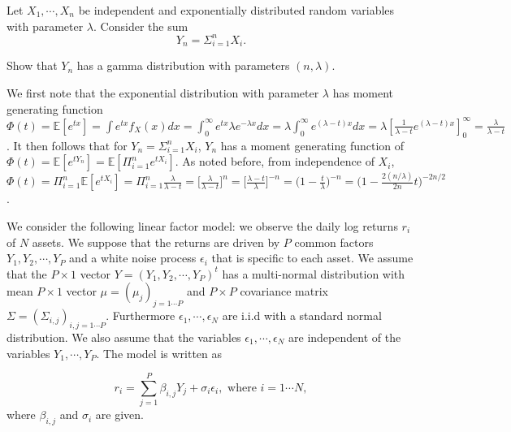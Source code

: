 \documentclass[12pt,twoside, letter]{exam}
\theoremstyle{definition}
\newcommand{\ee}{\mathbb{E}}
\begin{document}
Let $X_1,\cdots,X_n$ be independent and exponentially distributed random variables with parameter $\lambda$. Consider the sum
\[Y_n=\Sigma_{i=1}^n X_i.\]

Show that $Y_n$ has a gamma distribution with parameters $(n,\lambda)$.

\begin{solution}
  We first note that the exponential distribution with parameter $\lambda$ has moment generating function $\Phi(t) = \ee[e^{tx}] = \int e^{tx}f_X(x)dx =
  \int_{0}^{\infty} e^{tx}\lambda e^{-\lambda x}dx = \lambda \int_{0}^{\infty} e^{(\lambda - t)x}dx = \lambda [\frac{1}{\lambda - t} e^{(\lambda - t)x}]^{\infty}_{0} = \frac{\lambda}{\lambda - t}$.
  It then follows that for $Y_{n} = \Sigma_{i=1}^n X_{i}$, $Y_{n}$ has a moment generating function of $\Phi(t) = \ee[e^{tY_{n}}] = \ee[\Pi^{n}_{i=1} e^{tX_{i}}]$. As noted before, from independence
  of $X_{i}$, $\Phi(t) = \Pi^{n}_{i=1} \ee[e^{tX_{i}}] = \Pi^{n}_{i=1} \frac{\lambda}{\lambda - t} = \big[ \frac{\lambda}{\lambda - t} \big]^{n} = \big[ \frac{\lambda - t}{\lambda} \big]^{-n}
  = \big( 1 - \frac{t}{\lambda} \big)^{-n} = \big( 1 - \frac{2(n/\lambda)}{2n} t \big)^{-2n/2}$.
\end{solution}

\bigskip
{}

We consider the following linear factor model: we observe the daily log returns  $r_i$ of $N$ assets. We suppose that the returns are driven by $P$ common factors $Y_1,Y_2,\cdots, Y_P$ and a white noise process $\epsilon_i$ that is specific to each asset. We assume that the $P\times 1$ vector $Y=(Y_1,Y_2,\cdots, Y_P)^t$ has a  multi-normal distribution with  mean $P\times 1$  vector $\mu=(\mu_j)_{j=1\cdots P}$ and $P\times P$  covariance matrix $\Sigma=(\Sigma_{i,j})_{i,j=1\cdots P}$. Furthermore $\epsilon_1,\cdots,\epsilon_N$ are i.i.d with a standard normal distribution. We also assume that the variables $\epsilon_1,\cdots,\epsilon_N$ are independent of the variables $Y_1,\cdots,Y_P$. The model is written as

\[r_i= \sum_{j=1}^P \beta_{i,j}Y_j+ \sigma_{i}\epsilon_i, \mbox{ where } i=1\cdots N, \]  where $\beta_{i,j}$ and $\sigma_i$ are given.
\end{document}
